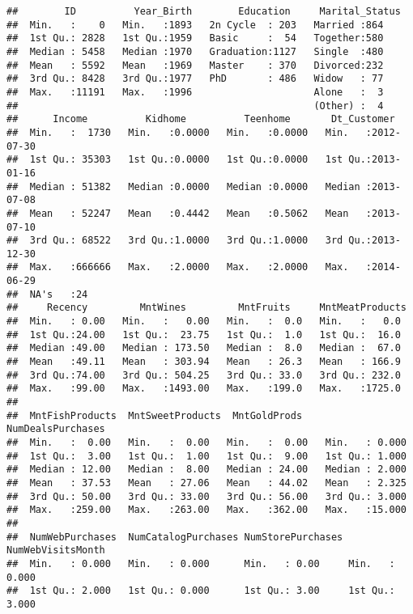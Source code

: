\documentclass[]{article}
\begin{document}
\begin{verbatim}
##        ID          Year_Birth        Education     Marital_Status
##  Min.   :    0   Min.   :1893   2n Cycle  : 203   Married :864   
##  1st Qu.: 2828   1st Qu.:1959   Basic     :  54   Together:580   
##  Median : 5458   Median :1970   Graduation:1127   Single  :480   
##  Mean   : 5592   Mean   :1969   Master    : 370   Divorced:232   
##  3rd Qu.: 8428   3rd Qu.:1977   PhD       : 486   Widow   : 77   
##  Max.   :11191   Max.   :1996                     Alone   :  3   
##                                                   (Other) :  4   
##      Income          Kidhome          Teenhome       Dt_Customer        
##  Min.   :  1730   Min.   :0.0000   Min.   :0.0000   Min.   :2012-07-30  
##  1st Qu.: 35303   1st Qu.:0.0000   1st Qu.:0.0000   1st Qu.:2013-01-16  
##  Median : 51382   Median :0.0000   Median :0.0000   Median :2013-07-08  
##  Mean   : 52247   Mean   :0.4442   Mean   :0.5062   Mean   :2013-07-10  
##  3rd Qu.: 68522   3rd Qu.:1.0000   3rd Qu.:1.0000   3rd Qu.:2013-12-30  
##  Max.   :666666   Max.   :2.0000   Max.   :2.0000   Max.   :2014-06-29  
##  NA's   :24                                                             
##     Recency         MntWines         MntFruits     MntMeatProducts 
##  Min.   : 0.00   Min.   :   0.00   Min.   :  0.0   Min.   :   0.0  
##  1st Qu.:24.00   1st Qu.:  23.75   1st Qu.:  1.0   1st Qu.:  16.0  
##  Median :49.00   Median : 173.50   Median :  8.0   Median :  67.0  
##  Mean   :49.11   Mean   : 303.94   Mean   : 26.3   Mean   : 166.9  
##  3rd Qu.:74.00   3rd Qu.: 504.25   3rd Qu.: 33.0   3rd Qu.: 232.0  
##  Max.   :99.00   Max.   :1493.00   Max.   :199.0   Max.   :1725.0  
##                                                                    
##  MntFishProducts  MntSweetProducts  MntGoldProds    NumDealsPurchases
##  Min.   :  0.00   Min.   :  0.00   Min.   :  0.00   Min.   : 0.000   
##  1st Qu.:  3.00   1st Qu.:  1.00   1st Qu.:  9.00   1st Qu.: 1.000   
##  Median : 12.00   Median :  8.00   Median : 24.00   Median : 2.000   
##  Mean   : 37.53   Mean   : 27.06   Mean   : 44.02   Mean   : 2.325   
##  3rd Qu.: 50.00   3rd Qu.: 33.00   3rd Qu.: 56.00   3rd Qu.: 3.000   
##  Max.   :259.00   Max.   :263.00   Max.   :362.00   Max.   :15.000   
##                                                                      
##  NumWebPurchases  NumCatalogPurchases NumStorePurchases NumWebVisitsMonth
##  Min.   : 0.000   Min.   : 0.000      Min.   : 0.00     Min.   : 0.000   
##  1st Qu.: 2.000   1st Qu.: 0.000      1st Qu.: 3.00     1st Qu.: 3.000   

\end{verbatim}
\end{document}

